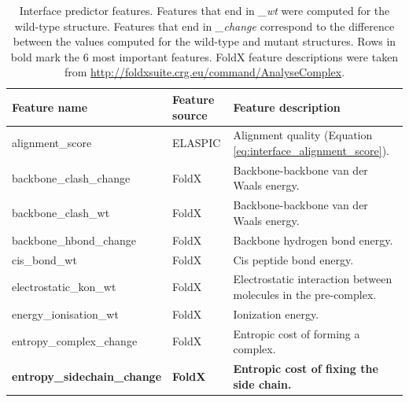 \begin{table}[tb]
	\centering
	\caption[Features selected for the interface predictor.]{
		Interface predictor features.
		Features that end in \textit{\_wt} were computed for the wild-type structure.
		Features that end in \textit{\_change} correspond to the difference between the values computed for the wild-type and mutant structures.
		Rows in bold mark the 6 most important features.
		FoldX feature descriptions were taken from \url{http://foldxsuite.crg.eu/command/AnalyseComplex}.
	}
	\label{tab:interface_features}
	\begin{tabular}{ l | l | p{8cm} }
		\toprule
		Feature name                          & Feature source   & Feature description                                                                                        \\
		\midrule
		alignment\_score                      & ELASPIC          & Alignment quality (Equation \ref{eq:interface_alignment_score}).                                           \\
		backbone\_clash\_change               & FoldX            & Backbone-backbone van der Waals energy.                                                                    \\
		backbone\_clash\_wt                   & FoldX            & Backbone-backbone van der Waals energy.                                                                    \\
		backbone\_hbond\_change               & FoldX            & Backbone hydrogen bond energy.                                                                             \\
		cis\_bond\_wt                         & FoldX            & Cis peptide bond energy.                                                                                   \\
		electrostatic\_kon\_wt                & FoldX            & Electrostatic interaction between molecules in the pre-complex.                                            \\
		energy\_ionisation\_wt                & FoldX            & Ionization energy.                                                                                         \\
		entropy\_complex\_change              & FoldX            & Entropic cost of forming a complex.                                                                        \\
		\textbf{entropy\_sidechain\_change}   & \textbf{FoldX}   & \textbf{Entropic cost of fixing the side chain.}                                                           \\

\end{tabular}
\end{table}
